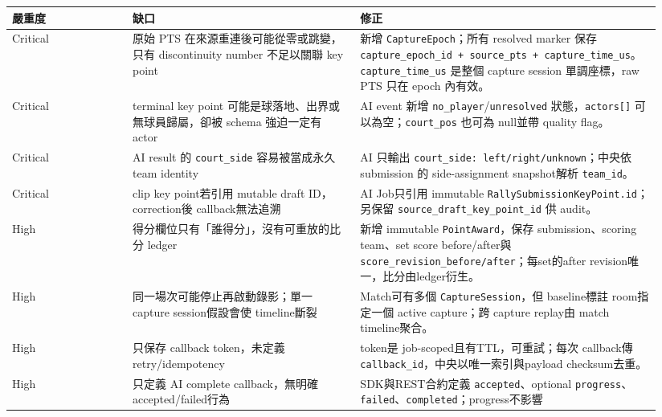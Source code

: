 \documentclass[
  9pt,
  a4paper,
]{article}
\begin{document}
\begin{longtable}[]{@{}>{\RaggedRight\arraybackslash}p{0.18\linewidth}>{\RaggedRight\arraybackslash}p{0.34\linewidth}>{\RaggedRight\arraybackslash}p{0.42\linewidth}@{}}
\toprule\noalign{}
嚴重度 & 缺口 & 修正 \\
\midrule\noalign{}
\endhead
\bottomrule\noalign{}
\endlastfoot
Critical & 原始 PTS 在來源重連後可能從零或跳變，只有 discontinuity
number 不足以關聯 key point & 新增 \texttt{CaptureEpoch}；所有 resolved
marker 保存
\texttt{capture\_\allowbreak{}epoch\_\allowbreak{}id\ +\ source\_\allowbreak{}pts\ +\ capture\_\allowbreak{}time\_\allowbreak{}us}。\texttt{capture\_\allowbreak{}time\_\allowbreak{}us}
是整個 capture session 單調座標，raw PTS 只在 epoch 內有效。 \\
Critical & terminal key point 可能是球落地、出界或無球員歸屬，卻被
schema 強迫一定有 actor & AI event 新增
\texttt{no\_\allowbreak{}player}/\texttt{unresolved} 狀態，\texttt{actors{[}{]}}
可以為空；\texttt{court\_\allowbreak{}pos} 也可為 null並帶 quality flag。 \\
Critical & AI result 的 \texttt{court\_\allowbreak{}side} 容易被當成永久 team
identity & AI 只輸出 \texttt{court\_\allowbreak{}side:\ left/right/unknown}；中央依
submission 的 side-assignment snapshot解析 \texttt{team\_\allowbreak{}id}。 \\
Critical & clip key point若引用 mutable draft ID，correction後
callback無法追溯 & AI Job只引用 immutable
\texttt{RallySubmissionKeyPoint.id}；另保留
\texttt{source\_\allowbreak{}draft\_\allowbreak{}key\_\allowbreak{}point\_\allowbreak{}id} 供 audit。 \\
High & 得分欄位只有「誰得分」，沒有可重放的比分 ledger & 新增 immutable
\texttt{PointAward}，保存 submission、scoring team、set score
before/after與\texttt{score\_\allowbreak{}revision\_\allowbreak{}before/after}；每set的after
revision唯一，比分由ledger衍生。 \\
High & 同一場次可能停止再啟動錄影；單一 capture session假設會使
timeline斷裂 & Match可有多個 \texttt{CaptureSession}，但 baseline標註
room指定一個 active capture；跨 capture replay由 match timeline聚合。 \\
High & 只保存 callback token，未定義 retry/idempotency & token是
job-scoped且有TTL，可重試；每次 callback傳
\texttt{callback\_\allowbreak{}id}，中央以唯一索引與payload checksum去重。 \\
High & 只定義 AI complete callback，無明確 accepted/failed行為 &
SDK與REST合約定義 \texttt{accepted}、optional
\texttt{progress}、\texttt{failed}、\texttt{completed}；progress不影響

\end{longtable}
\end{document}
